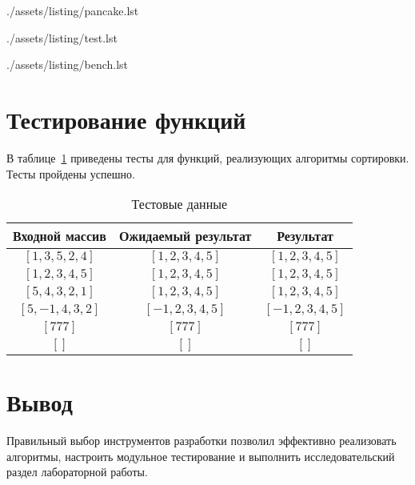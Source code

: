 \clearpage
\begin{lstinputlisting}[
	caption={Алгоритм блинной сортировки},
	label={lst:pancake},
	style={golang}
]{./assets/listing/pancake.lst}
\end{lstinputlisting}

\clearpage
\begin{lstinputlisting}[
	caption={Пример реализации теста},
	label={lst:tests},
	style={golang}
]{./assets/listing/test.lst}
\end{lstinputlisting}

\clearpage
\begin{lstinputlisting}[
	caption={Пример реализации бенчмарка},
	label={lst:benches},
	style={golang}
]{./assets/listing/bench.lst}
\end{lstinputlisting}

\section{Тестирование функций}

В таблице~\ref{tbl:test} приведены тесты для функций, реализующих алгоритмы сортировки. Тесты пройдены успешно.

\begin{table}[h!]
	\begin{center}
		\caption{\label{tbl:test}Тестовые данные}
		\begin{tabular}{|c|c|c|}
			\hline
			Входной массив & Ожидаемый результат & Результат \\ 
			\hline
			$[1,3,5,2,4]$ & $[1,2,3,4,5]$  & $[1,2,3,4,5]$\\
			$[1,2,3,4,5]$  & $[1,2,3,4,5]$ & $[1,2,3,4,5]$\\
			$[5,4,3,2,1]$  & $[1,2,3,4,5]$  & $[1,2,3,4,5]$\\
			$[5,-1,4,3,2]$  & $[-1,2,3,4,5]$  & $[-1,2,3,4,5]$\\
			$[777]$  & $[777]$  & $[777]$\\
			$[]$  & $[]$  & $[]$\\
			\hline
		\end{tabular}
	\end{center}
\end{table}

\section*{Вывод}

Правильный выбор инструментов разработки позволил эффективно реализовать алгоритмы, настроить модульное тестирование и выполнить исследовательский раздел лабораторной работы.
